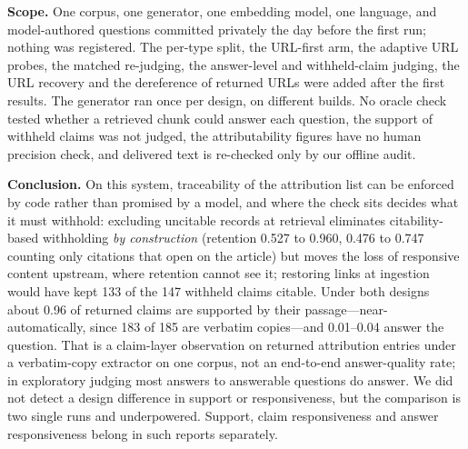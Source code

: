 \documentclass[conference,a4paper]{IEEEtran}
\begin{document}
\textbf{Scope.} One corpus, one generator, one embedding model, one language, and
model-authored questions committed privately the day before the first run; nothing was
registered. The per-type split, the URL-first arm, the adaptive URL probes, the matched
re-judging, the answer-level and withheld-claim judging, the URL recovery and the dereference
of returned URLs were added after the first results. The generator ran once per design, on
different builds. No oracle check tested whether a retrieved chunk could answer each question,
the support of withheld claims was not judged, the attributability figures have no human
precision check, and delivered text is re-checked only by our offline audit.

\textbf{Conclusion.} On this system, traceability of the attribution list can be enforced by
code rather than promised by a model, and where the check sits decides what it must withhold:
excluding uncitable records at retrieval eliminates citability-based withholding \emph{by
construction} (retention \num{0.527} to \num{0.960}, \num{0.476} to \num{0.747} counting only
citations that open on the article) but moves the loss of responsive content upstream, where
retention cannot see it; restoring links at ingestion would have kept 133 of the 147 withheld
claims citable. Under both designs about \num{0.96} of returned claims are supported by their
passage---near-automatically, since 183 of 185 are verbatim copies---and \numrange{0.01}{0.04}
answer the question. That is a claim-layer observation on returned attribution entries under
a verbatim-copy extractor on one corpus, not an end-to-end answer-quality rate; in exploratory
judging most answers to answerable questions do answer. We did not detect a design difference
in support or responsiveness, but the comparison is two single runs and underpowered.
Support, claim responsiveness and answer responsiveness belong in such reports separately.



\end{document}
